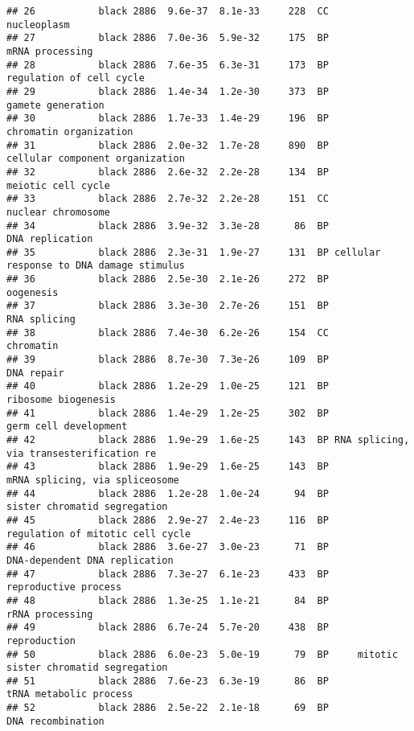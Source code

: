 \documentclass[]{article}
\begin{document}
\begin{verbatim}
## 26           black 2886  9.6e-37  8.1e-33     228  CC                              nucleoplasm
## 27           black 2886  7.0e-36  5.9e-32     175  BP                          mRNA processing
## 28           black 2886  7.6e-35  6.3e-31     173  BP                 regulation of cell cycle
## 29           black 2886  1.4e-34  1.2e-30     373  BP                        gamete generation
## 30           black 2886  1.7e-33  1.4e-29     196  BP                   chromatin organization
## 31           black 2886  2.0e-32  1.7e-28     890  BP          cellular component organization
## 32           black 2886  2.6e-32  2.2e-28     134  BP                       meiotic cell cycle
## 33           black 2886  2.7e-32  2.2e-28     151  CC                       nuclear chromosome
## 34           black 2886  3.9e-32  3.3e-28      86  BP                          DNA replication
## 35           black 2886  2.3e-31  1.9e-27     131  BP cellular response to DNA damage stimulus
## 36           black 2886  2.5e-30  2.1e-26     272  BP                                oogenesis
## 37           black 2886  3.3e-30  2.7e-26     151  BP                             RNA splicing
## 38           black 2886  7.4e-30  6.2e-26     154  CC                                chromatin
## 39           black 2886  8.7e-30  7.3e-26     109  BP                               DNA repair
## 40           black 2886  1.2e-29  1.0e-25     121  BP                      ribosome biogenesis
## 41           black 2886  1.4e-29  1.2e-25     302  BP                    germ cell development
## 42           black 2886  1.9e-29  1.6e-25     143  BP RNA splicing, via transesterification re
## 43           black 2886  1.9e-29  1.6e-25     143  BP           mRNA splicing, via spliceosome
## 44           black 2886  1.2e-28  1.0e-24      94  BP             sister chromatid segregation
## 45           black 2886  2.9e-27  2.4e-23     116  BP         regulation of mitotic cell cycle
## 46           black 2886  3.6e-27  3.0e-23      71  BP            DNA-dependent DNA replication
## 47           black 2886  7.3e-27  6.1e-23     433  BP                     reproductive process
## 48           black 2886  1.3e-25  1.1e-21      84  BP                          rRNA processing
## 49           black 2886  6.7e-24  5.7e-20     438  BP                             reproduction
## 50           black 2886  6.0e-23  5.0e-19      79  BP     mitotic sister chromatid segregation
## 51           black 2886  7.6e-23  6.3e-19      86  BP                   tRNA metabolic process
## 52           black 2886  2.5e-22  2.1e-18      69  BP                        DNA recombination

\end{verbatim}
\end{document}
